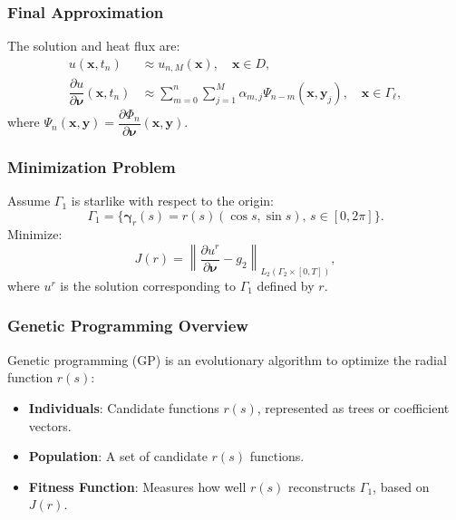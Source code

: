 \documentclass{beamer}
\newcommand{\bvec}[1]{\boldsymbol{#1}} %
\begin{document}
\begin{frame}
    \frametitle{Final Approximation}
    The solution and heat flux are:
    \begin{align}
        u(\bvec{x}, t_n) &\approx u_{n, M}(\bvec{x}), \quad \bvec{x} \in D, \\
        \dfrac{\partial u}{\partial \bvec{\nu}}(\bvec{x}, t_n) &\approx \sum_{m=0}^n \sum_{j=1}^M \alpha_{m,j} \Psi_{n-m}(\bvec{x}, \bvec{y}_j), \quad \bvec{x} \in \Gamma_\ell,
    \end{align}
    where \( \Psi_n(\bvec{x}, \bvec{y}) = \dfrac{\partial \Phi_n}{\partial \bvec{\nu}}(\bvec{x}, \bvec{y}) \).
\end{frame}

\begin{frame}
    \frametitle{Minimization Problem}
    Assume \( \Gamma_1 \) is starlike with respect to the origin:
    \begin{equation}
        \Gamma_1 = \{ \bvec{\gamma}_r(s) = r(s) (\cos s, \sin s), \, s \in [0, 2\pi] \}.
    \end{equation}
    Minimize:
    \begin{equation}\label{eq:min_functional}
        J(r) = \left\| \dfrac{\partial u^r}{\partial \bvec{\nu}} - g_2 \right\|_{L_2(\Gamma_2 \times [0, T])},
    \end{equation}
    where \( u^r \) is the solution corresponding to \( \Gamma_1 \) defined by \( r \).
\end{frame}

\begin{frame}
    \frametitle{Genetic Programming Overview}
    Genetic programming (GP) is an evolutionary algorithm to optimize the radial function \( r(s) \):
    \begin{itemize}
        \item \textbf{Individuals}: Candidate functions \( r(s) \), represented as trees or coefficient vectors.
        \item \textbf{Population}: A set of candidate \( r(s) \) functions.
        \item \textbf{Fitness Function}: Measures how well \( r(s) \) reconstructs \( \Gamma_1 \), based on \( J(r) \).
    \end{itemize}
\end{frame}
\end{document}
